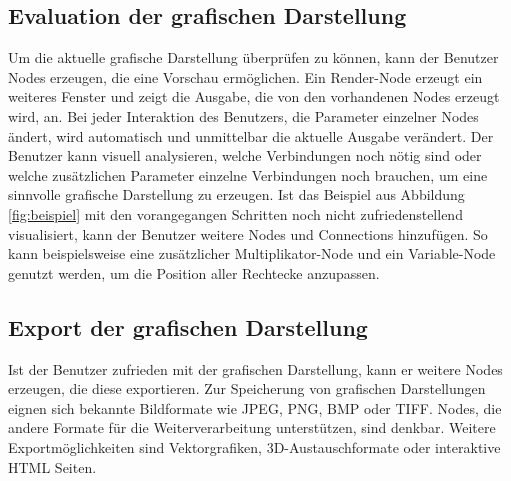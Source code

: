 \documentclass[a4paper, 
               12pt,
               DIV=calc,
               version=first,
               pdftex,
               headsepline,
               footsepline,
               bibliography=totocnumbered,
               listof=numbered]{scrreprt}
\begin{document}
\subsection{Evaluation der grafischen Darstellung}
Um die aktuelle grafische Darstellung überprüfen zu können, kann der Benutzer Nodes
erzeugen, die eine Vorschau ermöglichen. Ein Render-Node erzeugt ein weiteres
Fenster und zeigt die Ausgabe, die von den vorhandenen Nodes erzeugt wird, an.
Bei jeder Interaktion des Benutzers, die Parameter einzelner Nodes ändert,
wird automatisch und unmittelbar die aktuelle Ausgabe verändert.
Der Benutzer kann visuell analysieren, welche Verbindungen noch nötig sind
oder welche zusätzlichen Parameter einzelne Verbindungen noch brauchen, um eine sinnvolle grafische 
Darstellung zu erzeugen. Ist das Beispiel aus Abbildung \ref{fig:beispiel} mit den vorangegangen Schritten noch nicht
zufriedenstellend visualisiert, kann der Benutzer weitere Nodes und Connections
hinzufügen. So kann beispielsweise eine zusätzlicher Multiplikator-Node und ein
Variable-Node genutzt werden, um die Position aller Rechtecke anzupassen.
\subsection{Export der grafischen Darstellung}
Ist der Benutzer zufrieden mit der grafischen Darstellung, kann er weitere Nodes
erzeugen, die diese exportieren. Zur Speicherung von grafischen Darstellungen
eignen sich bekannte Bildformate wie JPEG, PNG, BMP oder TIFF. Nodes, die andere Formate
für die Weiterverarbeitung unterstützen, sind denkbar. Weitere Exportmöglichkeiten
sind Vektorgrafiken, 3D-Austauschformate oder interaktive HTML Seiten.
\end{document}
